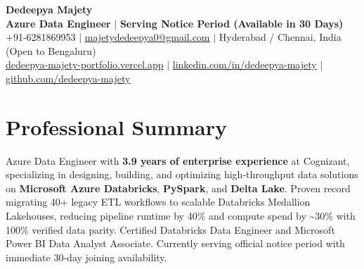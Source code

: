 \documentclass[letterpaper,10pt]{article}
\begin{document}
\begin{center}
    {\Huge \bfseries \color{primaryAccent} Dedeepya Majety} \\ \vspace{2pt}
    \textbf{Azure Data Engineer} $\vert$ \textbf{Serving Notice Period (Available in 30 Days)} \\ \vspace{2pt}
    \small +91-6281869953 $\vert$ \href{mailto:majetydedeepya0@gmail.com}{\underline{majetydedeepya0@gmail.com}} $\vert$ Hyderabad / Chennai, India (Open to Bengaluru) \\ \vspace{1.5pt}
    \href{https://dedeepya-majety-portfolio.vercel.app}{\underline{dedeepya-majety-portfolio.vercel.app}} $\vert$ \href{https://linkedin.com/in/dedeepya-majety}{\underline{linkedin.com/in/dedeepya-majety}} $\vert$ \href{https://github.com/dedeepya-majety}{\underline{github.com/dedeepya-majety}}
\end{center}
\vspace{-8pt}

\section{Professional Summary}
\small{
Azure Data Engineer with \textbf{3.9 years of enterprise experience} at Cognizant, specializing in designing, building, and optimizing high-throughput data solutions on \textbf{Microsoft Azure Databricks}, \textbf{PySpark}, and \textbf{Delta Lake}. Proven record migrating 40+ legacy ETL workflows to scalable Databricks Medallion Lakehouses, reducing pipeline runtime by 40\% and compute spend by \textasciitilde30\% with 100\% verified data parity. Certified Databricks Data Engineer and Microsoft Power BI Data Analyst Associate. Currently serving official notice period with immediate 30-day joining availability.
}
\vspace{-2pt}

\end{document}
